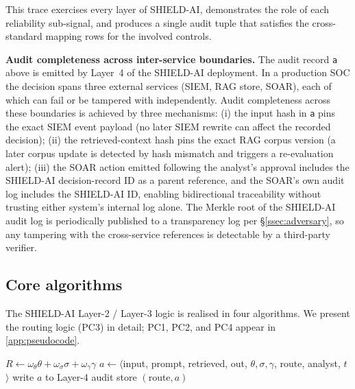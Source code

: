 \documentclass[preprint,12pt,authoryear]{elsarticle}
\begin{document}
This trace exercises every layer of SHIELD-AI, demonstrates the role of each reliability sub-signal, and produces a single audit tuple that satisfies the cross-standard mapping rows for the involved controls.

\textbf{Audit completeness across inter-service boundaries.}
The audit record \texttt{a} above is emitted by Layer~4 of the SHIELD-AI deployment. In a production SOC the decision spans three external services (SIEM, RAG store, SOAR), each of which can fail or be tampered with independently. Audit completeness across these boundaries is achieved by three mechanisms: (i) the input hash in \texttt{a} pins the exact SIEM event payload (no later SIEM rewrite can affect the recorded decision); (ii) the retrieved-context hash pins the exact RAG corpus version (a later corpus update is detected by hash mismatch and triggers a re-evaluation alert); (iii) the SOAR action emitted following the analyst's approval includes the SHIELD-AI decision-record ID as a parent reference, and the SOAR's own audit log includes the SHIELD-AI ID, enabling bidirectional traceability without trusting either system's internal log alone. The Merkle root of the SHIELD-AI audit log is periodically published to a transparency log per §\ref{ssec:adversary}, so any tampering with the cross-service references is detectable by a third-party verifier.

\subsection{Core algorithms}
\label{ssec:pseudocode}

The SHIELD-AI Layer-2 / Layer-3 logic is realised in four algorithms. We present the routing logic (PC3) in detail; PC1, PC2, and PC4 appear in \ref{app:pseudocode}.

\begin{algorithm}[ht]
\caption{PC3; Human Validation and Hallucination Control}
\label{alg:pc3}
$R \gets \omega_\theta\theta + \omega_\sigma\sigma + \omega_\gamma\gamma$ 
$a \gets \langle$\textnormal{input, prompt, retrieved, out, $\theta, \sigma, \gamma$, route, analyst, $t$}$\rangle$\;
\textnormal{write $a$ to Layer-4 audit store}\;
\Return $(\text{route}, a)$
\end{algorithm}
\end{document}
